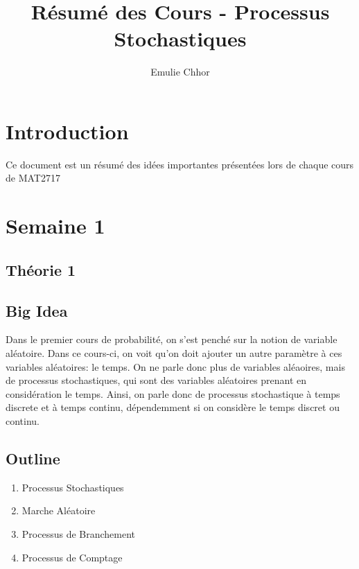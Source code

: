 \documentclass{article}
\begin{document}
\title{Résumé des Cours - Processus Stochastiques}
\author{Emulie Chhor}
\maketitle

\section*{Introduction}

Ce document est un résumé des idées importantes présentées lors de chaque cours
de MAT2717

\newtheorem{definition}{Definition}[subsection]
\newtheorem{theorem}{Theorem}[subsection]
\newtheorem{corollary}{Corollary}[subsection]
\newtheorem{lemma}[theorem]{Lemma}
\newtheorem{proposition}{Proposition}[section]
\newtheorem{axiom}{Axiome}
\newtheorem{property}{Propriété}[subsection]
\newtheorem*{remark}{Remarque}
\newtheorem*{problem}{Problème}
\newtheorem*{intuition}{Intuition}


\pagebreak
\section{Semaine 1}
\subsection{Théorie 1}

\subsection*{Big Idea}

Dans le premier cours de probabilité, on s'est penché sur la notion de variable
aléatoire. Dans ce cours-ci, on voit qu'on doit ajouter un autre paramètre à
ces variables aléatoires: le temps. On ne parle donc plus de variables aléaoires,
mais de processus stochastiques, qui sont des variables aléatoires prenant en
considération le temps. Ainsi, on parle donc de processus stochastique à temps
discrete et à temps continu, dépendemment si on considère le temps discret ou
continu.

\subsection*{Outline}
    \begin{enumerate}
    \item Processus Stochastiques
    \item Marche Aléatoire
    \item Processus de Branchement
    \item Processus de Comptage
    \end{enumerate}
\end{document}
